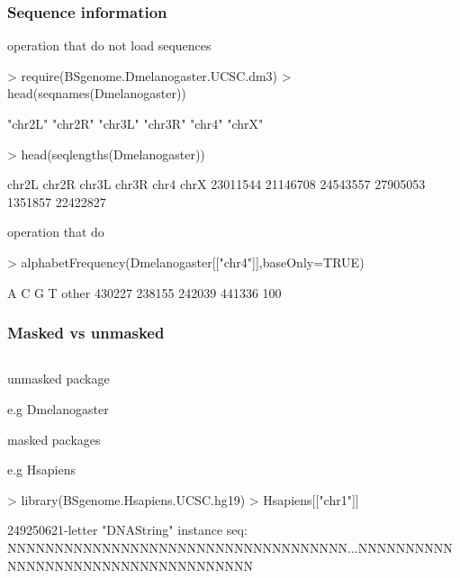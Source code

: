 \documentclass{beamer}
\begin{document}
\begin{frame}[fragile]
\frametitle{Sequence information}
  \bit
      \item operation that do not load sequences
        \begin{uncoverenv}
\begin{Schunk}
\begin{Sinput}
> require(BSgenome.Dmelanogaster.UCSC.dm3)
> head(seqnames(Dmelanogaster))
\end{Sinput}
\begin{Soutput}
[1] "chr2L" "chr2R" "chr3L" "chr3R" "chr4"  "chrX" 
\end{Soutput}
\begin{Sinput}
> head(seqlengths(Dmelanogaster))
\end{Sinput}
\begin{Soutput}
   chr2L    chr2R    chr3L    chr3R     chr4     chrX 
23011544 21146708 24543557 27905053  1351857 22422827 
\end{Soutput}
\end{Schunk}
        \end{uncoverenv}
      \item operation that do
        \begin{uncoverenv}
\begin{Schunk}
\begin{Sinput}
> alphabetFrequency(Dmelanogaster[["chr4"]],baseOnly=TRUE)
\end{Sinput}
\begin{Soutput}
     A      C      G      T  other 
430227 238155 242039 441336    100 
\end{Soutput}
\end{Schunk}
        \end{uncoverenv}      
  \eit
\end{frame}


\begin{frame}[fragile]
\frametitle{Masked vs unmasked}
  \begin{column}[t]{1\textwidth}%
  \bit
      \item unmasked package
        \bit
            \item e.g Dmelanogaster
        \eit
      \item masked packages
        \bit
            \item e.g Hsapiens
        \eit
  \eit
        \begin{uncoverenv}
\begin{Schunk}
\begin{Sinput}
> library(BSgenome.Hsapiens.UCSC.hg19)
> Hsapiens[["chr1"]]
\end{Sinput}
\begin{Soutput}
  249250621-letter "DNAString" instance
seq: NNNNNNNNNNNNNNNNNNNNNNNNNNNNNNNNNNNN...NNNNNNNNNNNNNNNNNNNNNNNNNNNNNNNNNNNN
\end{Soutput}
\end{Schunk}
        \end{uncoverenv}   
  \end{column}
\end{frame}
\end{document}
